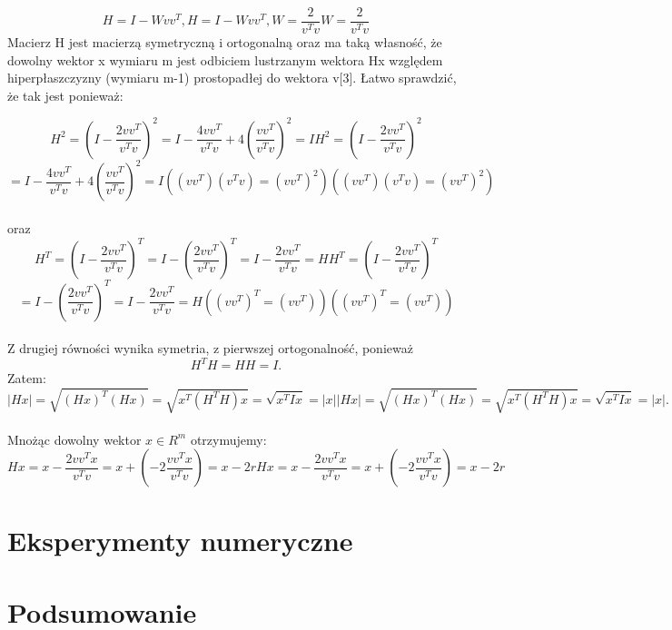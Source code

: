 \documentclass[10pt,a4paper]{report}
\begin{document}
$${\displaystyle H=I-Wvv^{T}, } {\displaystyle H=I-Wvv^{T}, }       {\displaystyle W={\frac {2}{v^{T}v}}} {\displaystyle W={\frac {2}{v^{T}v}}}$$ 
Macierz H jest macierzą symetryczną i ortogonalną oraz ma taką własność, że dowolny wektor x wymiaru m jest odbiciem lustrzanym wektora Hx względem hiperpłaszczyzny (wymiaru m-1) prostopadłej do wektora v[3]. Łatwo sprawdzić, że tak jest ponieważ: 

$${\displaystyle H^{2}=\left(I-{\frac {2vv^{T}}{v^{T}v}}\right)^{2}=I-{\frac {4vv^{T}}{v^{T}v}}+4\left({\frac {vv^{T}}{v^{T}v}}\right)^{2}=I} {\displaystyle H^{2}=\left(I-{\frac {2vv^{T}}{v^{T}v}}\right)^{2}}$$ \newline  $$= {I-{\frac {4vv^{T}}{v^{T}v}}+4\left({\frac {vv^{T}}{v^{T}v}}\right)^{2}=I}       {\displaystyle ((vv^{T})(v^{T}v)=(vv^{T})^{2})} {\displaystyle ((vv^{T})(v^{T}v)=(vv^{T})^{2})}$$\\
oraz\\

$${\displaystyle H^{T}=\left(I-{\frac {2vv^{T}}{v^{T}v}}\right)^{T}=I-\left({\frac {2vv^{T}}{v^{T}v}}\right)^{T}=I-{\frac {2vv^{T}}{v^{T}v}}=H} {\displaystyle H^{T}=\left(I-{\frac {2vv^{T}}{v^{T}v}}\right)^{T}}$$ \newline $$={I-\left({\frac {2vv^{T}}{v^{T}v}}\right)^{T}=I-{\frac {2vv^{T}}{v^{T}v}}=H}       {\displaystyle ((vv^{T})^{T}=(vv^{T}))} {\displaystyle ((vv^{T})^{T}=(vv^{T}))}$$\\
Z drugiej równości wynika symetria, z pierwszej ortogonalność, ponieważ $${\displaystyle H^{T}H=HH=I}. $$ Zatem:\\

$${\displaystyle |Hx|={\sqrt {(Hx)^{T}(Hx)}}={\sqrt {x^{T}(H^{T}H)x}}={\sqrt {x^{T}Ix}}=|x|} {\displaystyle |Hx|={\sqrt {(Hx)^{T}(Hx)}}={\sqrt {x^{T}(H^{T}H)x}}={\sqrt {x^{T}Ix}}=|x|}. $$\\
Mnożąc dowolny wektor ${\displaystyle x\in R^{m}}$ otrzymujemy:\\

$${\displaystyle Hx=x-{\frac {2vv^{T}x}{v^{T}v}}=x+(-2{\frac {vv^{T}x}{v^{T}v}})=x-2r} {\displaystyle Hx=x-{\frac {2vv^{T}x}{v^{T}v}}=x+(-2{\frac {vv^{T}x}{v^{T}v}})=x-2r}$$





\chapter{Eksperymenty numeryczne}

\chapter{Podsumowanie}
\end{document}
